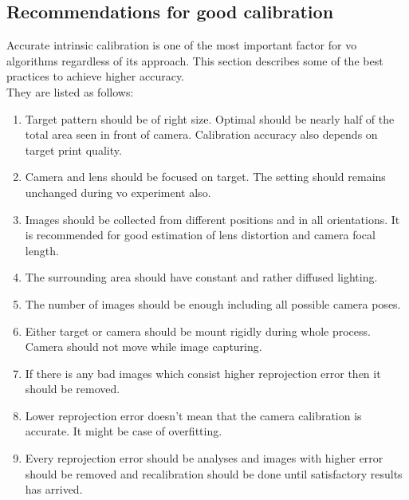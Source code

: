 \subsection{Recommendations for good calibration}
Accurate intrinsic calibration is one of the most important factor for \acrshort{vo} algorithms regardless of its approach. This section describes some of the best practices to achieve higher accuracy. \\
\newline They are listed as follows:
\begin{enumerate}
	\item Target pattern should be of right size. Optimal should be nearly half of the total area seen in front of camera. Calibration accuracy also depends on target print quality.
	\item Camera and lens should be focused on target. The setting should remains unchanged during \acrshort{vo} experiment also. 
	\item Images should be collected from different positions and in all orientations. It is recommended for good estimation of lens distortion and camera focal length.
	\item The surrounding area should have constant and rather diffused lighting. 
	\item The number of images should be enough including all possible camera poses.
	\item Either target or camera should be mount rigidly during whole process. Camera should not move while image capturing.
	\item If there is any bad images which consist higher reprojection error then it should be removed.
	\item Lower reprojection error doesn't mean that the camera calibration is accurate. It might be case of overfitting. \item Every reprojection error should be analyses and images with higher error should be removed and recalibration should be done until satisfactory results has arrived.
\end{enumerate}

